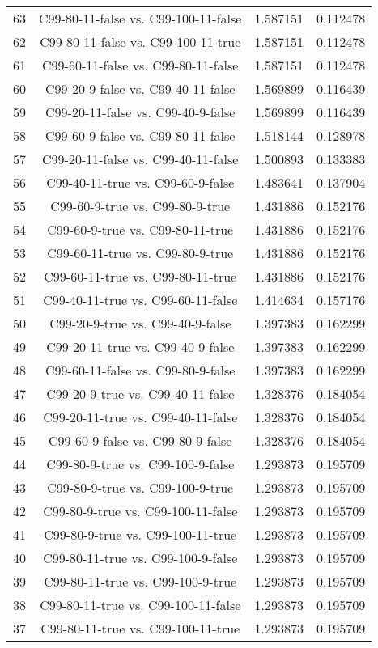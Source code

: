 \documentclass[a4paper,10pt]{article}
\begin{document}
\begin{landscape}
\begin{table}[!htp]
\begin{tabular}{cccc}
63&C99-80-11-false vs. C99-100-11-false&1.587151&0.112478\\
62&C99-80-11-false vs. C99-100-11-true&1.587151&0.112478\\
61&C99-60-11-false vs. C99-80-11-false&1.587151&0.112478\\
60&C99-20-9-false vs. C99-40-11-false&1.569899&0.116439\\
59&C99-20-11-false vs. C99-40-9-false&1.569899&0.116439\\
58&C99-60-9-false vs. C99-80-11-false&1.518144&0.128978\\
57&C99-20-11-false vs. C99-40-11-false&1.500893&0.133383\\
56&C99-40-11-true vs. C99-60-9-false&1.483641&0.137904\\
55&C99-60-9-true vs. C99-80-9-true&1.431886&0.152176\\
54&C99-60-9-true vs. C99-80-11-true&1.431886&0.152176\\
53&C99-60-11-true vs. C99-80-9-true&1.431886&0.152176\\
52&C99-60-11-true vs. C99-80-11-true&1.431886&0.152176\\
51&C99-40-11-true vs. C99-60-11-false&1.414634&0.157176\\
50&C99-20-9-true vs. C99-40-9-false&1.397383&0.162299\\
49&C99-20-11-true vs. C99-40-9-false&1.397383&0.162299\\
48&C99-60-11-false vs. C99-80-9-false&1.397383&0.162299\\
47&C99-20-9-true vs. C99-40-11-false&1.328376&0.184054\\
46&C99-20-11-true vs. C99-40-11-false&1.328376&0.184054\\
45&C99-60-9-false vs. C99-80-9-false&1.328376&0.184054\\
44&C99-80-9-true vs. C99-100-9-false&1.293873&0.195709\\
43&C99-80-9-true vs. C99-100-9-true&1.293873&0.195709\\
42&C99-80-9-true vs. C99-100-11-false&1.293873&0.195709\\
41&C99-80-9-true vs. C99-100-11-true&1.293873&0.195709\\
40&C99-80-11-true vs. C99-100-9-false&1.293873&0.195709\\
39&C99-80-11-true vs. C99-100-9-true&1.293873&0.195709\\
38&C99-80-11-true vs. C99-100-11-false&1.293873&0.195709\\
37&C99-80-11-true vs. C99-100-11-true&1.293873&0.195709\\

\end{tabular}
\end{table}
\end{landscape}
\end{document}
